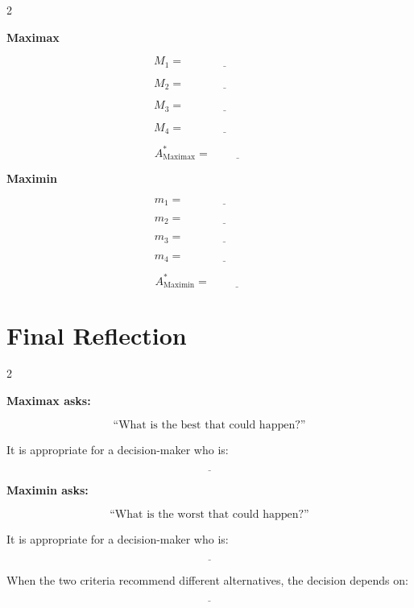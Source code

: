 	\begin{multicols}{2}
		
		\textbf{Maximax}
		
		\[
		M_1=\underline{\hspace{3cm}}
		\]
		
		\[
		M_2=\underline{\hspace{3cm}}
		\]
		
		\[
		M_3=\underline{\hspace{3cm}}
		\]
		
		\[
		M_4=\underline{\hspace{3cm}}
		\]
		
		\[
		A^*_{\mathrm{Maximax}}
		=\underline{\hspace{2cm}}
		\]
		
		\columnbreak
		
		\textbf{Maximin}
		
		\[
		m_1=\underline{\hspace{3cm}}
		\]
		
		\[
		m_2=\underline{\hspace{3cm}}
		\]
		
		\[
		m_3=\underline{\hspace{3cm}}
		\]
		
		\[
		m_4=\underline{\hspace{3cm}}
		\]
		
		\[
		A^*_{\mathrm{Maximin}}
		=\underline{\hspace{2cm}}
		\]
		
	\end{multicols}
	
	
	\section{Final Reflection}
	
	\begin{multicols}{2}
		
		\textbf{Maximax asks:}
		
		\[
		\text{``What is the best that could happen?''}
		\]
		
		It is appropriate for a decision-maker who is:
		
		\[
		\underline{\hspace{5cm}}
		\]
		
		\columnbreak
		
		\textbf{Maximin asks:}
		
		\[
		\text{``What is the worst that could happen?''}
		\]
		
		It is appropriate for a decision-maker who is:
		
		\[
		\underline{\hspace{5cm}}
		\]
		
	\end{multicols}
	
	When the two criteria recommend different alternatives, the decision
	depends on:
	
	\[
	\underline{\hspace{12cm}}
	\]
	
